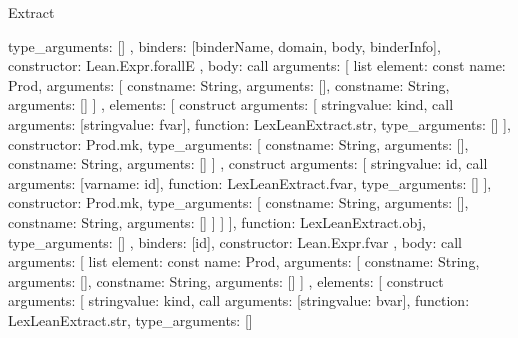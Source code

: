\begin{lexlean}{Extract}
\begin{toolingmodule}
{{{{{              type_arguments: []
            },
            binders: [binderName, domain, body, binderInfo],
            constructor: Lean.Expr.forallE
          },
          {
            body: call{
              arguments: [
                list{
                  element: const{
                    name: Prod,
                    arguments: [
                      const{name: String, arguments: []},
                      const{name: String, arguments: []}
                    ]
                  },
                  elements: [
                    construct{
                      arguments: [
                        string{value: kind},
                        call{
                          arguments: [string{value: fvar}],
                          function: LexLeanExtract.str,
                          type_arguments: []
                        }
                      ],
                      constructor: Prod.mk,
                      type_arguments: [
                        const{name: String, arguments: []},
                        const{name: String, arguments: []}
                      ]
                    },
                    construct{
                      arguments: [
                        string{value: id},
                        call{
                          arguments: [var{name: id}],
                          function: LexLeanExtract.fvar,
                          type_arguments: []
                        }
                      ],
                      constructor: Prod.mk,
                      type_arguments: [
                        const{name: String, arguments: []},
                        const{name: String, arguments: []}
                      ]
                    }
                  ]
                }
              ],
              function: LexLeanExtract.obj,
              type_arguments: []
            },
            binders: [id],
            constructor: Lean.Expr.fvar
          },
          {
            body: call{
              arguments: [
                list{
                  element: const{
                    name: Prod,
                    arguments: [
                      const{name: String, arguments: []},
                      const{name: String, arguments: []}
                    ]
                  },
                  elements: [
                    construct{
                      arguments: [
                        string{value: kind},
                        call{
                          arguments: [string{value: bvar}],
                          function: LexLeanExtract.str,
                          type_arguments: []
}}}}}}}}
\end{toolingmodule}
\end{lexlean}
